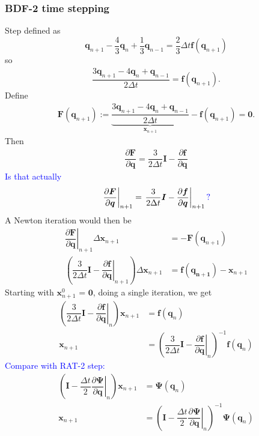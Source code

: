 \documentclass[12pt]{article}
\newcommand{\todo}[1]{\textcolor{blue}{#1}}
\begin{document}
\subsubsection{BDF-2 time stepping}

Step defined as
\begin{equation}
    \bm{q}_{n+1} - \dfrac{4}{3}\bm{q}_n + \dfrac{1}{3}\bm{q}_{n-1} = \dfrac{2}{3}\Delta t \bm{f}(\bm{q}_{n+1})
\end{equation}
so
\begin{align}
    \dfrac{3\bm{q}_{n+1} - 4\bm{q}_n + \bm{q}_{n-1}}{2\Delta t} = \bm{f}(\bm{q}_{n+1})
    \text{.}
\end{align}
Define
\begin{align}
    \bm{F}(\bm{q}_{n+1}) := 
        \underbrace{\dfrac{3\bm{q}_{n+1} - 4\bm{q}_n + \bm{q}_{n-1}}{2\Delta t}}_{\bm{x}_{n+1}}{}
         - \bm{f}(\bm{q}_{n+1})
        = \bm{0}
    \text{.}
\end{align}
Then
\begin{align}
    \dfrac{\partial \bm{F}}{\partial\bm{q}} =
        \dfrac{3}{2\Delta t}\bm{I} - \dfrac{\partial\bm{f}}{\partial\bm{q}}
\end{align}
\todo{Is that actually}
\begin{align}
    \left. \dfrac{\partial \bm{F}}{\partial\bm{q}} \right|_{n+1} =
        \left. \dfrac{3}{2\Delta t}\bm{I} - \dfrac{\partial\bm{f}}{\partial\bm{q}} \right|_{n+1}
    \text{\todo{?}}
\end{align}
A Newton iteration would then be
\begin{align}
    \left. \dfrac{\partial\bm{F}}{\partial\bm{q}} \right|_{n+1} \Delta\bm{x}_{n+1}
        &= -\bm{F}(\bm{q}_{n+1})
        \\
    \left( \dfrac{3}{2\Delta t}\bm{I} - \left. \dfrac{\partial\bm{f}}{\partial\bm{q}}\right|_{n+1}  \right)
        \Delta\bm{x}_{n+1}
        &= \bm{f(\bm{q}_{n+1})} - \bm{x}_{n+1}
\end{align}
Starting with $\bm{x}_{n+1}^0$ = $\bm{0}$, doing a single iteration, we get
\begin{align}
    \left( \dfrac{3}{2\Delta t}\bm{I} - \left. \dfrac{\partial\bm{f}}{\partial\bm{q}}\right|_{n}  \right)
        \bm{x}_{n+1}
    &= \bm{f}(\bm{q}_n)
    \\
    \bm{x}_{n+1} &= 
    \left( \dfrac{3}{2\Delta t}\bm{I} - \left. \dfrac{\partial\bm{f}}{\partial\bm{q}}\right|_{n}  \right)^{-1}
    \bm{f}(\bm{q}_n)
\end{align}
\todo{Compare with RAT-2 step:}
\begin{align}
    \left( \bm{I} - \dfrac{\Delta t}{2} \left.\dfrac{\partial\bm{\Psi}}{\partial\bm{q}}\right|_n \right)
    \bm{x}_{n+1}
    &= \bm{\Psi}(\bm{q}_n)
    \\
    \bm{x}_{n+1}
    &=
    \left( \bm{I} - \dfrac{\Delta t}{2} \left.\dfrac{\partial\bm{\Psi}}{\partial\bm{q}}\right|_n \right) ^{-1}
    \bm{\Psi}(\bm{q}_n)
\end{align}
\end{document}
